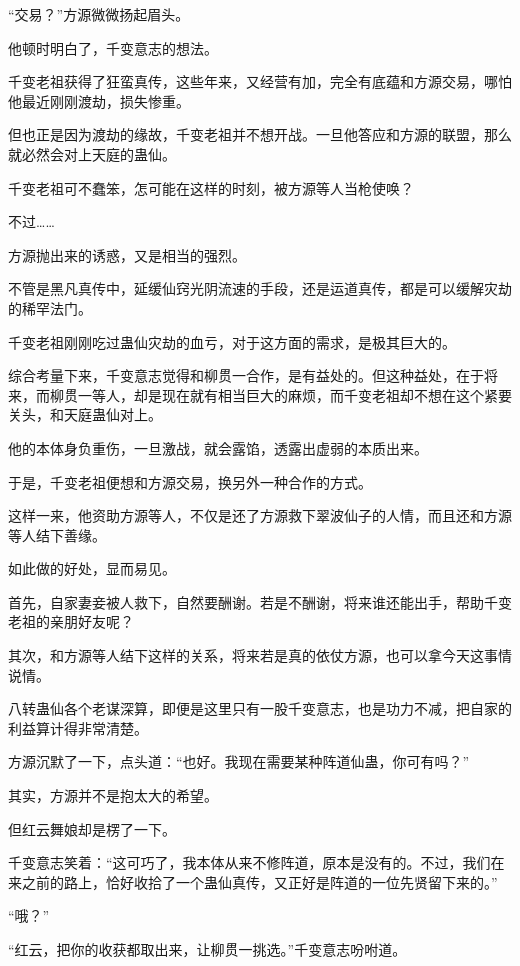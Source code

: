 
\begin{this_body}

“交易？”方源微微扬起眉头。

他顿时明白了，千变意志的想法。

千变老祖获得了狂蛮真传，这些年来，又经营有加，完全有底蕴和方源交易，哪怕他最近刚刚渡劫，损失惨重。

但也正是因为渡劫的缘故，千变老祖并不想开战。一旦他答应和方源的联盟，那么就必然会对上天庭的蛊仙。

千变老祖可不蠢笨，怎可能在这样的时刻，被方源等人当枪使唤？

不过……

方源抛出来的诱惑，又是相当的强烈。

不管是黑凡真传中，延缓仙窍光阴流速的手段，还是运道真传，都是可以缓解灾劫的稀罕法门。

千变老祖刚刚吃过蛊仙灾劫的血亏，对于这方面的需求，是极其巨大的。

综合考量下来，千变意志觉得和柳贯一合作，是有益处的。但这种益处，在于将来，而柳贯一等人，却是现在就有相当巨大的麻烦，而千变老祖却不想在这个紧要关头，和天庭蛊仙对上。

他的本体身负重伤，一旦激战，就会露馅，透露出虚弱的本质出来。

于是，千变老祖便想和方源交易，换另外一种合作的方式。

这样一来，他资助方源等人，不仅是还了方源救下翠波仙子的人情，而且还和方源等人结下善缘。

如此做的好处，显而易见。

首先，自家妻妾被人救下，自然要酬谢。若是不酬谢，将来谁还能出手，帮助千变老祖的亲朋好友呢？

其次，和方源等人结下这样的关系，将来若是真的依仗方源，也可以拿今天这事情说情。

八转蛊仙各个老谋深算，即便是这里只有一股千变意志，也是功力不减，把自家的利益算计得非常清楚。

方源沉默了一下，点头道：“也好。我现在需要某种阵道仙蛊，你可有吗？”

其实，方源并不是抱太大的希望。

但红云舞娘却是楞了一下。

千变意志笑着：“这可巧了，我本体从来不修阵道，原本是没有的。不过，我们在来之前的路上，恰好收拾了一个蛊仙真传，又正好是阵道的一位先贤留下来的。”

“哦？”

“红云，把你的收获都取出来，让柳贯一挑选。”千变意志吩咐道。


\end{this_body}
